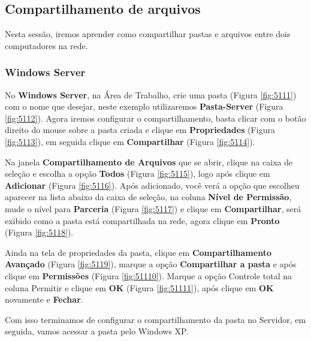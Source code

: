 \documentclass[10pt]{article}
\begin{document}
\subsection{Compartilhamento de arquivos}
\par Nesta sessão, iremos aprender como compartilhar pastas e arquivos entre dois computadores na rede.
\subsubsection{Windows Server}
\par No \textbf{Windows Server}, na Área de Trabalho, crie uma pasta (Figura \ref{fig:5111}) com o nome que desejar, neste exemplo utilizaremos \textbf{Pasta-Server} (Figura \ref{fig:5112}). Agora iremos configurar o compartilhamento, basta clicar com o botão direito do mouse sobre a pasta criada e clique em \textbf{Propriedades} (Figura \ref{fig:5113}), em seguida clique em \textbf{Compartilhar} (Figura \ref{fig:5114}).
\par Na janela \textbf{Compartilhamento de Arquivos} que se abrir, clique na caixa de seleção e escolha a opção \textbf{Todos} (Figura \ref{fig:5115}), logo após clique em \textbf{Adicionar} (Figura \ref{fig:5116}). Após adicionado, você verá a opção que escolheu aparecer na lista abaixo da caixa de seleção, na coluna \textbf{Nível de Permissão}, mude o nível para \textbf{Parceria} (Figura \ref{fig:5117}) e clique em \textbf{Compartilhar}, será exibido como a pasta está compartilhada na rede, agora clique em \textbf{Pronto} (Figura \ref{fig:5118}).
\par Ainda na tela de propriedades da pasta, clique em \textbf{Compartilhamento Avançado} (Figura \ref{fig:5119}), marque a opção \textbf{Compartilhar a pasta} e após clique em \textbf{Permissões} (Figura \ref{fig:51110}). Marque a opção Controle total na coluna Permitir e clique em \textbf{OK} (Figura \ref{fig:51111}), após clique em \textbf{OK} novamente e \textbf{Fechar}.
\par Com isso terminamos de configurar o compartilhamento da pasta no Servidor, em seguida, vamos acessar a pasta pelo Windows XP.
\end{document}
